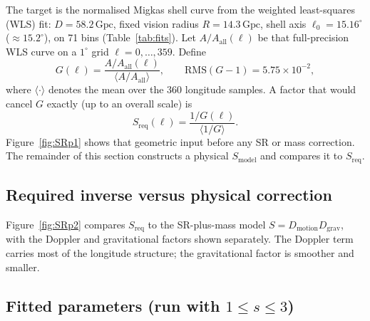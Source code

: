 \documentclass[11pt,a4paper]{article}
\begin{document}
The target is the normalised Migkas shell curve from the weighted least-squares (WLS) fit: \(D = 58.2\,\mathrm{Gpc}\), fixed vision radius \(R = 14.3\,\mathrm{Gpc}\), shell axis \(\ell_0 = 15.16^\circ\) (\(\approx15.2^\circ\)), on 71 bins (Table~\ref{tab:fits}). Let \(A/A_{\mathrm{all}}(\ell)\) be that full-precision WLS curve on a \(1^\circ\) grid \(\ell=0,\ldots,359\). Define
\begin{equation}
\label{eq:G}
G(\ell)=\frac{A/A_{\mathrm{all}}(\ell)}{\langle A/A_{\mathrm{all}}\rangle},
\qquad
\mathrm{RMS}(G-1)=5.75\times10^{-2},
\end{equation}
where \(\langle\cdot\rangle\) denotes the mean over the \(360\) longitude samples. A factor that would cancel \(G\) exactly (up to an overall scale) is
\begin{equation}
\label{eq:Sreq}
S_{\mathrm{req}}(\ell)=\frac{1/G(\ell)}{\langle 1/G\rangle}.
\end{equation}
\suppressfloats[t]%
Figure~\ref{fig:SRp1} shows that geometric input before any SR or mass correction. The remainder of this section constructs a physical \(S_{\mathrm{model}}\) and compares it to \(S_{\mathrm{req}}\).

\setcounter{topnumber}{2}
\setcounter{bottomnumber}{2}
\setcounter{totalnumber}{2}
\makeatletter
\setlength{\@fpsep}{8pt}
\makeatother

\suppressfloats[t]

\subsection{Required inverse versus physical correction}

Figure~\ref{fig:SRp2} compares \(S_{\mathrm{req}}\) to the SR-plus-mass model \(S=D_{\mathrm{motion}}D_{\mathrm{grav}}\), with the Doppler and gravitational factors shown separately. The Doppler term carries most of the longitude structure; the gravitational factor is smoother and smaller.



\subsection{Fitted parameters (run with \(1\le s\le3\))}
\end{document}
